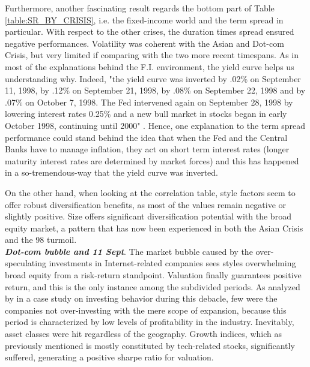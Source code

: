 \documentclass[12pt]{article}
\begin{document}
Furthermore, another fascinating result regards the bottom part of Table \ref{table:SR_BY_CRISIS}, i.e. the fixed-income world and the term spread in particular. With respect to the other crises, the duration times spread ensured negative performances. Volatility was coherent with the Asian and Dot-com Crisis, but very limited if comparing with the two more recent timespans. As in most of the explanations behind the F.I. environment, the yield curve helps us understanding why. Indeed, "the yield curve was inverted by .02\% on September 11, 1998, by .12\% on September 21, 1998, by .08\% on September 22, 1998 and by .07\% on October 7, 1998. The Fed intervened again on September 28, 1998 by lowering interest rates 0.25\% and a new bull market in stocks began in early October 1998, continuing until 2000" \cite{RBC_yield_curve1998}. Hence, one explanation to the term spread performance could stand behind the idea that when the Fed and the Central Banks have to manage inflation, they act on short term interest rates (longer maturity interest rates are determined by market forces) and this has happened in a so-tremendous-way that the yield curve was inverted.

On the other hand, when looking at the correlation table, style factors seem to offer robust diversification benefits, as most of the values remain negative or slightly positive. Size offers significant diversification potential with the broad equity market, a pattern that has now been experienced in both the Asian Crisis and the 98 turmoil. \\

\textit{\textbf{Dot-com bubble and 11 Sept}}. The market bubble caused by the over-speculating investments in Internet-related companies sees styles overwhelming broad equity from a risk-return standpoint. Valuation finally guarantees positive return, and this is the only instance among the subdivided periods. As analyzed by  in a case study on investing behavior during this debacle, few were the companies not over-investing with the mere scope of expansion, because this period is characterized by low levels of profitability in the industry. Inevitably, asset classes were hit regardless of the geography. Growth indices, which as previously mentioned is mostly constituted by tech-related stocks, significantly suffered, generating a positive sharpe ratio for valuation.
\end{document}
